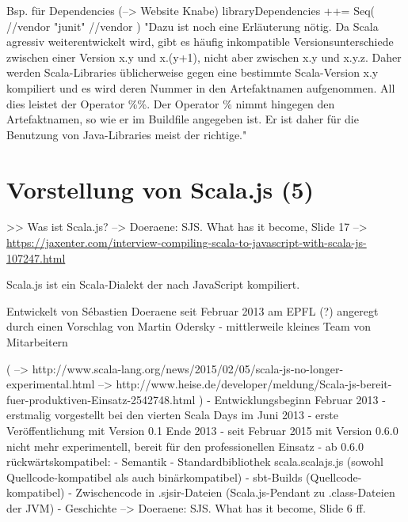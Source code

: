 \documentclass[a4paper, 12pt, hidelinks, listof=totoc, listoftables=totoc, bibliography=totoc]{scrreprt}
\begin{document}
Bsp. für Dependencies (-->  Website Knabe)
	libraryDependencies ++= Seq(
       //vendor %
       "junit" %
       //vendor %
    )
    "Dazu ist noch eine Erläuterung nötig. Da Scala agressiv weiterentwickelt wird, gibt es häufig inkompatible Versionsunterschiede zwischen einer Version x.y und x.(y+1), nicht aber zwischen x.y und x.y.z. Daher werden Scala-Libraries üblicherweise gegen eine bestimmte Scala-Version x.y kompiliert und es wird deren Nummer in den Artefaktnamen aufgenommen. All dies leistet der Operator \%\%. Der Operator \% nimmt hingegen den Artefaktnamen, so wie er im Buildfile angegeben ist. Er ist daher für die Benutzung von Java-Libraries meist der richtige."



























\chapter{Vorstellung von Scala.js (5)}




>> Was ist Scala.js?
-->  Doeraene: SJS. What has it become, Slide 17 %
-->  \url{https://jaxenter.com/interview-compiling-scala-to-javascript-with-scala-js-107247.html}

Scala.js ist ein Scala-Dialekt der nach JavaScript kompiliert.\cite[S. 1]{doeraene2013.TDI}

Entwickelt von Sébastien Doeraene seit Februar 2013 am EPFL (?) angeregt durch einen Vorschlag von Martin Odersky
- mittlerweile kleines Team von Mitarbeitern
\cite{doeraene2013.CSJ}


(
  -->  http://www.scala-lang.org/news/2015/02/05/scala-js-no-longer-experimental.html
  -->  http://www.heise.de/developer/meldung/Scala-js-bereit-fuer-produktiven-Einsatz-2542748.html
)
- Entwicklungsbeginn Februar 2013
- erstmalig vorgestellt bei den vierten Scala Days im Juni 2013
- erste Veröffentlichung mit Version 0.1 Ende 2013
- seit Februar 2015 mit Version 0.6.0 nicht mehr experimentell, bereit für den professionellen Einsatz
  - ab 0.6.0 rückwärtskompatibel:
    - Semantik
    - Standardbibliothek scala.scalajs.js (sowohl Quellcode-kompatibel als auch binärkompatibel)
    - sbt-Builds (Quellcode-kompatibel)
  - Zwischencode in .sjsir-Dateien (Scala.js-Pendant zu .class-Dateien der JVM)  
- Geschichte
-->  Doeraene: SJS. What has it become, Slide 6 ff.
\end{document}
